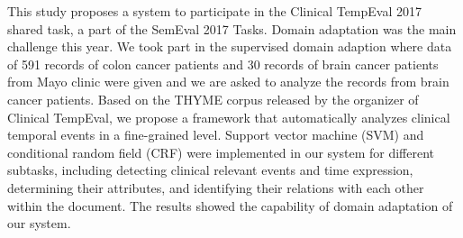 This study proposes a system to participate in the Clinical TempEval 2017 shared task, a part of the SemEval 2017 Tasks. Domain adaptation was the main challenge this year. We took part in the supervised domain adaption where data of 591 records of colon cancer patients and 30 records of brain cancer patients from Mayo clinic were given and we are asked to analyze the records from brain cancer patients. Based on the THYME corpus released by the organizer of Clinical TempEval, we propose a framework that automatically analyzes clinical temporal events in a fine-grained level. Support vector machine (SVM) and conditional random field (CRF) were implemented in our system for different subtasks, including detecting clinical relevant events and time expression, determining their attributes, and identifying their relations with each other within the document. The results showed the capability of domain adaptation of our system.
